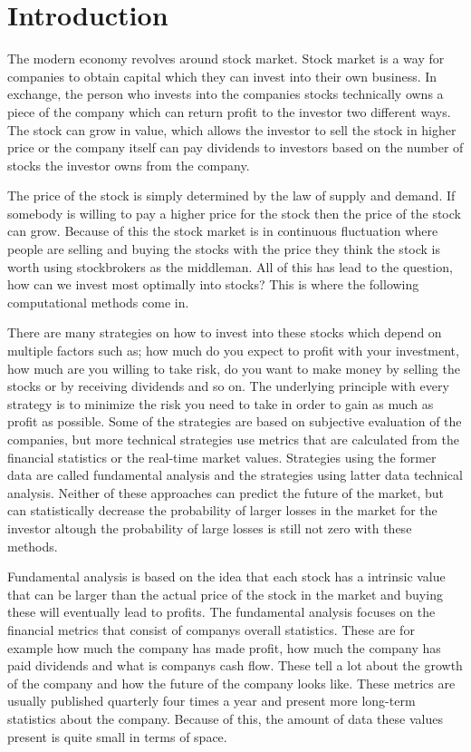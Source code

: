 \chapter{Introduction}
\label{chapter:intro}

The modern economy revolves around stock market.
Stock market is a way for companies to obtain capital which they can invest into their own business.
In exchange, the person who invests into the companies stocks technically owns a piece of the company which can return profit to the investor two different ways.
The stock can grow in value, which allows the investor to sell the stock in higher price or the company itself can pay dividends to investors based on the number of stocks the investor owns from the company.

The price of the stock is simply determined by the law of supply and demand. 
If somebody is willing to pay a higher price for the stock then the price of the stock can grow.
Because of this the stock market is in continuous fluctuation where people are selling and buying the stocks with the price they think the stock is worth using stockbrokers as the middleman. \cite{person}
All of this has lead to the question, how can we invest most optimally into stocks?
This is where the following computational methods come in. 

There are many strategies on how to invest into these stocks which depend on multiple factors such as; how much do you expect to profit with your investment, how much are you willing to take risk, do you want to make money by selling the stocks or by receiving dividends and so on.
The underlying principle with every strategy is to minimize the risk you need to take in order to gain as much as profit as possible.
Some of the strategies are based on subjective evaluation of the companies, but more technical strategies use metrics that are calculated from the financial statistics or the real-time market values.
Strategies using the former data are called fundamental analysis and the strategies using latter data technical analysis.
Neither of these approaches can predict the future of the market, but can statistically decrease the probability of larger losses in the market for the investor altough the probability of large losses is still not zero with these methods. \cite{fox}

Fundamental analysis is based on the idea that each stock has a intrinsic value that can be larger than the actual price of the stock in the market and buying these will eventually lead to profits.\cite{sohnke}
The fundamental analysis focuses on the financial metrics that consist of companys overall statistics.
These are for example how much the company has made profit, how much the company has paid dividends and what is companys cash flow.
These tell a lot about the growth of the company and how the future of the company looks like.
These metrics are usually published quarterly four times a year and present more long-term statistics about the company.
Because of this, the amount of data these values present is quite small in terms of space.

